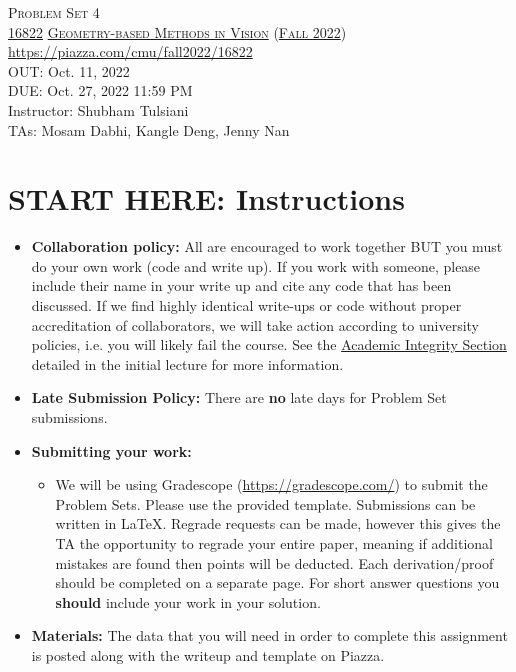 \documentclass[11pt,addpoints,answers]{exam}
\title{\textsc{\hwName}} %
\author{}
\date{}
\date{}
\numberwithin{equation}{section} %
\numberwithin{figure}{section} %
\numberwithin{table}{section} %
\newcommand{\courseNum}{\href{https://geometric3d.github.io}{16822}}
\newcommand{\courseName}{\href{https://geometric3d.github.io}{Geometry-based Methods in Vision}}
\newcommand{\courseSem}{\href{https://geometric3d.github.io}{Fall 2022}}
\newcommand{\courseUrl}{\url{https://piazza.com/cmu/fall2022/16822}}
\newcommand{\hwNum}{Problem Set 4}
\newcommand{\hwTopic}{Two View Geometry and Reconstruction}
\newcommand{\outDate}{Oct. 11, 2022}
\newcommand{\dueDate}{Oct. 27, 2022 11:59 PM}
\newcommand{\instructorName}{Shubham Tulsiani}
\newcommand{\taNames}{Mosam Dabhi, Kangle Deng, Jenny Nan}
\begin{document}
\section*{}
\begin{center}
  \textsc{\LARGE \hwNum} \\
  \vspace{1em}
  \textsc{\large \courseNum{} \courseName{} (\courseSem)} \\
  \courseUrl\\
  \vspace{1em}
  OUT: \outDate \\
  DUE: \dueDate \\
  Instructor: \instructorName \\
  TAs: \taNames
\end{center}

\section*{START HERE: Instructions}
\begin{itemize}
\item \textbf{Collaboration policy:} All are encouraged to work together BUT you must do your own work (code and write up). If you work with someone, please include their name in your write up and cite any code that has been discussed. If we find highly identical write-ups or code without proper accreditation of collaborators, we will take action according to university policies, i.e. you will likely fail the course. See the \href{https://www.dropbox.com/s/z6o0tinc9eaez46/L01_Overview.pdf?dl=0}{Academic Integrity Section} detailed in the initial lecture for more information.

\item\textbf{Late Submission Policy:} There are \textbf{no} late days for Problem Set submissions.

\item\textbf{Submitting your work:}

\begin{itemize}

\item We will be using Gradescope (\url{https://gradescope.com/}) to submit the Problem Sets. Please use the provided template. Submissions can be written in LaTeX. Regrade requests can be made, however this gives the TA the opportunity to regrade your entire paper, meaning if additional mistakes are found then points will be deducted.
Each derivation/proof should be  completed on a separate page. For short answer questions you \textbf{should} include your work in your solution.  
\end{itemize}

\item \textbf{Materials:} The data that you will need in order to complete this assignment is posted along with the writeup and template on Piazza.

\end{itemize}
\end{document}
